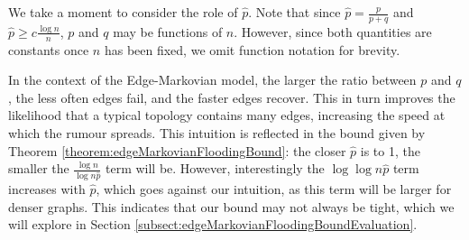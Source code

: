 We take a moment to consider the role of $\hat{p}$. Note that since $\hat{p} = \frac{p}{p+q}$ and $\hat{p} \geq c \frac{\log n}{n}$, $p$ and $q$ may be functions of $n$. However, since both quantities are constants once $n$ has been fixed, we omit function notation for brevity.

In the context of the Edge-Markovian model, the larger the ratio between $p$ and $q$, the less often edges fail, and the faster edges recover. %
This in turn improves the likelihood that a typical topology contains many edges, increasing the speed at which the rumour spreads. This intuition is reflected in the bound given by Theorem \ref{theorem:edgeMarkovianFloodingBound}: the closer $\hat{p}$ is to 1, the smaller the $\frac{\log n}{\log n \hat{p}}$ term will be. However, interestingly the $\log \log n \hat{p}$ term increases with $\hat{p}$, which goes against our intuition, as this term will be larger for denser graphs. This indicates that our bound may not always be tight, which we will explore in Section \ref{subsect:edgeMarkovianFloodingBoundEvaluation}.

